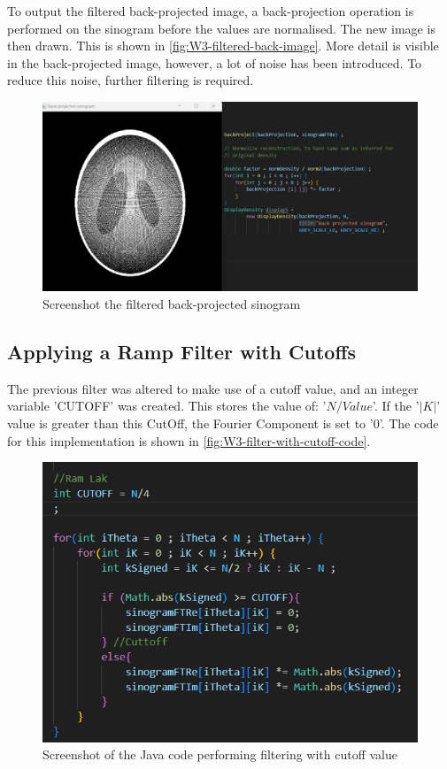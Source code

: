 To output the filtered back-projected image, a back-projection operation is performed on the sinogram before the values are normalised. The new image is then drawn. This is shown in \autoref{fig:W3-filtered-back-image}. More detail is visible in the back-projected image, however, a lot of noise has been introduced. To reduce this noise, further filtering is required.
    
\begin{figure}[H] 
    \centering
    \includegraphics[width=1\columnwidth]{Figures/Week 3/filtered-back-projection.png}
    \caption{Screenshot the filtered back-projected sinogram}
    \label{fig:W3-filtered-back-image}
\end{figure}


\subsection{Applying a Ramp Filter with Cutoffs}
The previous filter was altered to make use of a cutoff value, and an integer variable 'CUTOFF' was created. This stores the value of: '$N / Value$'. If the '$|K|$' value is greater than this CutOff, the Fourier Component is set to '0'. The code for this implementation is shown in \autoref{fig:W3-filter-with-cutoff-code}.

\begin{figure}[H] 
    \centering
    \includegraphics[width=1\columnwidth]{Figures/Week 3/Filter-with-cuttoff-code.png}
    \caption{Screenshot of the Java code performing filtering with cutoff value}
    \label{fig:W3-filter-with-cutoff-code}
\end{figure}


